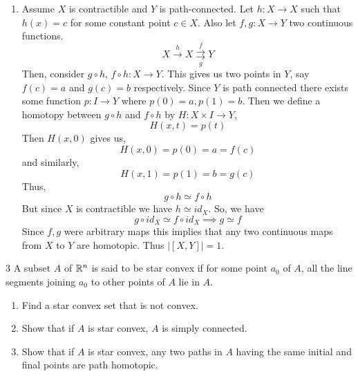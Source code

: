 \documentclass[12pt]{article}
\begin{document}
\begin{solution}
\begin{enumerate}
        \item Assume $X$ is contractible and $Y$ is path-connected.  Let $h: X \to X$ such that $h(x) = c$ for some constant point $c \in X$. Also let $f,g: X \to Y$ two continuous functions.
        \[X \xrightarrow{h} X \underset{g}{\overset{f}{\rightrightarrows}} Y\]
        Then, consider $g \circ h,\, f \circ h : X \to Y$. This gives us two points in $Y$, say $f(c) = a$ and $g(c) = b$ respectively. Since $Y$ is path connected there exists some function $p: I \to Y$ where $p(0) = a, p(1) =b$. Then we define a homotopy between $g \circ h$ and $f \circ h$ by $H: X \times I \to Y$, 
        \[H(x, t) = p(t)\]
        Then $H(x,0)$ gives us, 
        \[H(x,0) = p(0) = a = f(c)\] 
        and similarly, 
        \[H(x,1) = p(1) = b = g(c)\] 
        Thus,
        \[g \circ h \simeq f \circ h\]
        But since $X$ is contractible we have $h \simeq id_X$. So, we have 
        \[g \circ id_X \simeq f \circ id_X \implies g \simeq f\]
        Since $f,g$ were arbitrary maps this implies that any two continuous maps from $X$ to $Y$ are homotopic. Thus $|[X,Y]| = 1$.
    \end{enumerate}
\end{solution}

\newpage

\begin{problem}{3}
    A subset $A$ of $\mathbb R^n$ is said to be star convex if for some point $a_0$ of $A$, all the line segments joining $a_0$ to other points of $A$ lie in $A$. 
    \begin{enumerate}
        \item Find a star convex set that is not convex. 
        \item Show that if $A$ is star convex, $A$ is simply connected. 
        \item Show that if $A$ is star convex, any two paths in $A$ having the same initial and final points are path homotopic. 
    \end{enumerate}
\end{problem}
\end{document}

